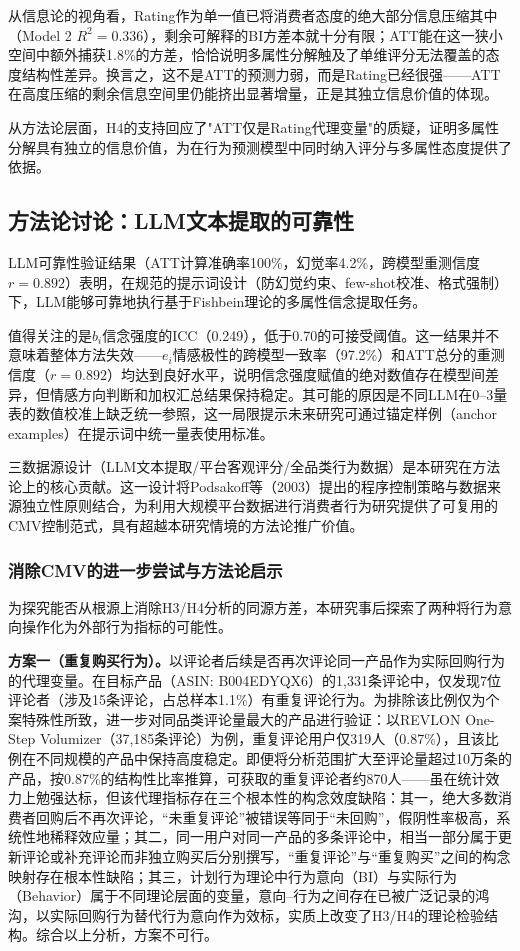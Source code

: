 从信息论的视角看，Rating作为单一值已将消费者态度的绝大部分信息压缩其中（Model 2 $R^2=0.336$），剩余可解释的BI方差本就十分有限；ATT能在这一狭小空间中额外捕获1.8\%的方差，恰恰说明多属性分解触及了单维评分无法覆盖的态度结构性差异。换言之，这不是ATT的预测力弱，而是Rating已经很强——ATT在高度压缩的剩余信息空间里仍能挤出显著增量，正是其独立信息价值的体现。

从方法论层面，H4的支持回应了"ATT仅是Rating代理变量"的质疑，证明多属性分解具有独立的信息价值，为在行为预测模型中同时纳入评分与多属性态度提供了依据。

\subsection{方法论讨论：LLM文本提取的可靠性}

LLM可靠性验证结果（ATT计算准确率100\%，幻觉率4.2\%，跨模型重测信度$r=0.892$）表明，在规范的提示词设计（防幻觉约束、few-shot校准、格式强制）下，LLM能够可靠地执行基于Fishbein理论的多属性信念提取任务。

值得关注的是$b_i$信念强度的ICC（0.249），低于0.70的可接受阈值。这一结果并不意味着整体方法失效——$e_i$情感极性的跨模型一致率（97.2\%）和ATT总分的重测信度（$r=0.892$）均达到良好水平，说明信念强度赋值的绝对数值存在模型间差异，但情感方向判断和加权汇总结果保持稳定。其可能的原因是不同LLM在0--3量表的数值校准上缺乏统一参照，这一局限提示未来研究可通过锚定样例（anchor examples）在提示词中统一量表使用标准。

三数据源设计（LLM文本提取/平台客观评分/全品类行为数据）是本研究在方法论上的核心贡献。这一设计将Podsakoff等（2003）\cite{podsakoff2003}提出的程序控制策略与数据来源独立性原则结合，为利用大规模平台数据进行消费者行为研究提供了可复用的CMV控制范式，具有超越本研究情境的方法论推广价值。

\subsubsection{消除CMV的进一步尝试与方法论启示}

为探究能否从根源上消除H3/H4分析的同源方差，本研究事后探索了两种将行为意向操作化为外部行为指标的可能性。

\textbf{方案一（重复购买行为）。}以评论者后续是否再次评论同一产品作为实际回购行为的代理变量。在目标产品（ASIN: B004EDYQX6）的1{,}331条评论中，仅发现7位评论者（涉及15条评论，占总样本1.1\%）有重复评论行为。为排除该比例仅为个案特殊性所致，进一步对同品类评论量最大的产品进行验证：以REVLON One-Step Volumizer（37{,}185条评论）为例，重复评论用户仅319人（0.87\%），且该比例在不同规模的产品中保持高度稳定。即便将分析范围扩大至评论量超过10万条的产品，按0.87\%的结构性比率推算，可获取的重复评论者约870人——虽在统计效力上勉强达标，但该代理指标存在三个根本性的构念效度缺陷：其一，绝大多数消费者回购后不再次评论，``未重复评论''被错误等同于``未回购''，假阴性率极高，系统性地稀释效应量；其二，同一用户对同一产品的多条评论中，相当一部分属于更新评论或补充评论而非独立购买后分别撰写，``重复评论''与``重复购买''之间的构念映射存在根本性缺陷；其三，计划行为理论中行为意向（BI）与实际行为（Behavior）属于不同理论层面的变量\cite{ajzen1991}，意向--行为之间存在已被广泛记录的鸿沟\cite{sheeran2022}，以实际回购行为替代行为意向作为效标，实质上改变了H3/H4的理论检验结构。综合以上分析，方案不可行。


